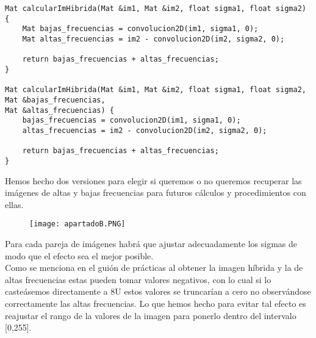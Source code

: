 \documentclass[10pt,a4paper]{article}
\begin{document}
\begin{lstlisting}
Mat calcularImHibrida(Mat &im1, Mat &im2, float sigma1, float sigma2) {
	Mat bajas_frecuencias = convolucion2D(im1, sigma1, 0);
	Mat altas_frecuencias = im2 - convolucion2D(im2, sigma2, 0);

	return bajas_frecuencias + altas_frecuencias;
}

Mat calcularImHibrida(Mat &im1, Mat &im2, float sigma1, float sigma2, Mat &bajas_frecuencias,
Mat &altas_frecuencias) {
	bajas_frecuencias = convolucion2D(im1, sigma1, 0);
	altas_frecuencias = im2 - convolucion2D(im2, sigma2, 0);

	return bajas_frecuencias + altas_frecuencias;
}
\end{lstlisting}

Hemos hecho dos versiones para elegir si queremos o no queremos recuperar las imágenes de altas y bajas frecuencias para futuros cálculos y procedimientos con ellas.\\

\begin{figure}[H]
\centering
\texttt{[image: apartadoB.PNG]}
\end{figure}

Para cada pareja de imágenes habrá que ajustar adecuadamente los sigmas de modo que el efecto sea el mejor posible.\\

Como se menciona en el guión de prácticas al obtener la imagen híbrida y la de altas frecuencias estas pueden tomar valores negativos, con lo cual si lo casteásemos directamente a 8U estos valores se truncarían a cero no observándose correctamente las altas frecuencias. Lo que hemos hecho para evitar tal efecto es reajustar el rango de la valores de la imagen para ponerlo dentro del intervalo [0,255].\\
\end{document}
